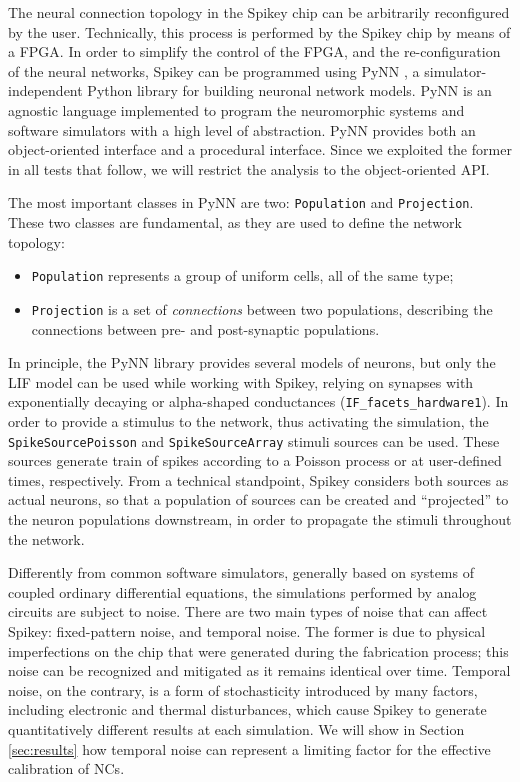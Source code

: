 \documentclass[utf8]{frontiersFPHY} %
\begin{document}
The neural connection topology in the Spikey chip can be arbitrarily reconfigured by the user.
Technically, this process is performed by the Spikey chip by means of a FPGA. 
In order to simplify the control of the FPGA, and the re-configuration of the neural networks, Spikey can be programmed using PyNN \cite{Davison2009}, a simulator-independent Python library for building neuronal network models. 
PyNN is an agnostic language implemented to program the neuromorphic systems and software simulators with a high level of abstraction. 
PyNN provides both an object-oriented interface and a procedural interface. 
Since we exploited the former in all tests that follow, we will restrict the analysis to the object-oriented API. 

The most important classes in PyNN are two: \texttt{Population} and  \texttt{Projection}. 
These two classes are fundamental, as they are used to define the network topology:
\begin{itemize}
 	\item \texttt{Population} represents a group of uniform cells, all of the same type;
 	\item \texttt{Projection} is a set of \emph{connections} between two populations, describing the connections
 	between pre- and post-synaptic populations. 
 \end{itemize} 
In principle, the PyNN library provides several models of neurons, but only the LIF model can be used while working with Spikey,
relying on synapses with exponentially decaying or alpha-shaped conductances (\texttt{IF\_facets\_hardware1}). 
In order to provide a stimulus to the network, thus activating the simulation, the \texttt{SpikeSourcePoisson} and \texttt{SpikeSourceArray} stimuli sources can
be used.
These sources generate train
of spikes according to a Poisson process or at user-defined times, respectively.
From a technical standpoint, Spikey considers both sources as actual neurons, so that a population of sources can be created and ``projected'' to the  neuron populations
downstream, in order to propagate the stimuli throughout the network.

Differently from common software simulators, generally based on systems of coupled ordinary differential equations, the simulations performed by analog circuits are subject to noise.
There are two main types of noise that can affect Spikey: fixed-pattern noise, and temporal noise. 
The former is due to physical imperfections on the chip that were generated during the fabrication process; this noise can be recognized and mitigated as it remains identical over time. 
Temporal noise, on the contrary, is a form of stochasticity introduced by many factors, including electronic and thermal disturbances, which cause Spikey to generate quantitatively different results at each simulation. 
We will show in Section \ref{sec:results} how temporal noise can represent a limiting factor for the effective calibration of NCs.
\end{document}
